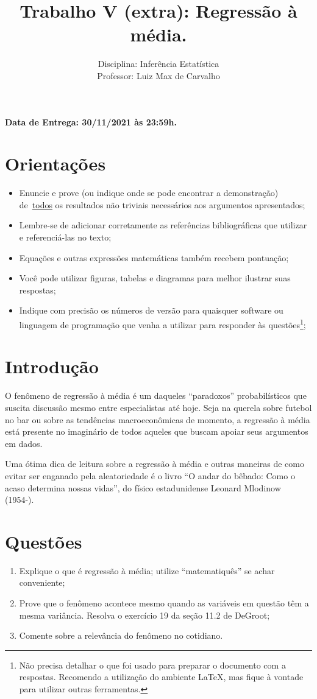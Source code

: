 \documentclass[a4paper,10pt, notitlepage]{report}
\title{Trabalho V (extra): Regressão à média.}
\author{Disciplina: Inferência Estatística \\ Professor: Luiz Max de Carvalho}
\begin{document}
\maketitle

\textbf{Data de Entrega: 30/11/2021 às 23:59h.}

\section*{Orientações}
\begin{itemize}
 \item Enuncie e prove (ou indique onde se pode encontrar a demonstração) de~\underline{todos} os resultados não triviais necessários aos argumentos apresentados;
 \item Lembre-se de adicionar corretamente as referências bibliográficas que utilizar e referenciá-las no texto;
 \item Equações e outras expressões matemáticas também recebem pontuação;
 \item Você pode utilizar figuras, tabelas e diagramas para melhor ilustrar suas respostas;
 \item Indique com precisão os números de versão para quaisquer software ou linguagem de programação que venha a utilizar para responder às questões\footnote{Não precisa detalhar o que foi usado para preparar o documento com a respostas. Recomendo a utilização do ambiente LaTeX, mas fique à vontade para utilizar outras ferramentas.};
 \end{itemize}


\section*{Introdução}

O fenômeno de regressão à média é um daqueles ``paradoxos'' probabilísticos que suscita discussão mesmo entre especialistas até hoje.
Seja na querela sobre futebol no bar ou sobre as tendências macroeconômicas de momento, a regressão à média está presente no imaginário de todos aqueles que buscam apoiar seus argumentos em dados.

Uma ótima dica de leitura sobre a regressão à média e outras maneiras de como evitar  ser enganado pela aleatoriedade é o livro ``O andar do bêbado: Como o acaso determina nossas vidas'', do físico estadunidense Leonard Mlodinow (1954-).

\section*{Questões}
\begin{enumerate}
 \item Explique o que é regressão à média; utilize ``matematiquês'' se achar conveniente;
 \item Prove que o fenômeno acontece mesmo quando as variáveis em questão têm a mesma variância.
 Resolva o exercício 19 da seção 11.2 de DeGroot;
 \item Comente sobre a relevância do fenômeno no cotidiano.
\end{enumerate}

 
% 
% 
\end{document}
